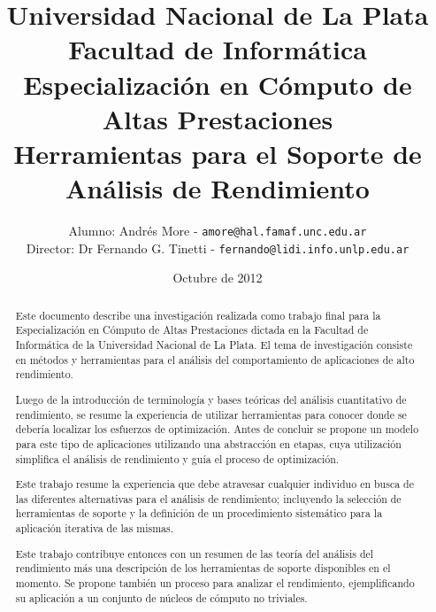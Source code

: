 \documentclass[a4paper]{report}
\begin{document}
\title{Universidad Nacional de La Plata\\Facultad de Inform\'atica\\ \bigskip
  Especializaci\'on en C\'omputo de Altas Prestaciones\\ \bigskip
  Herramientas para el Soporte de An\'alisis de Rendimiento}

\author{
  Alumno: Andr\'es More - {\tt amore@hal.famaf.unc.edu.ar}\\
  Director: Dr Fernando G. Tinetti - {\tt fernando@lidi.info.unlp.edu.ar}
}

\date{Octubre de 2012}

\maketitle

\begin{abstract}

  Este documento describe una investigaci\'on realizada como trabajo final para
  la Especializaci\'on en C\'omputo de Altas Prestaciones dictada en la
  Facultad de Inform\'atica de la Universidad Nacional de La Plata.
  El tema de investigaci\'on consiste en m\'etodos y herramientas para
  el an\'alisis del comportamiento de aplicaciones de alto rendimiento.

  \bigskip

  Luego de la introducci\'on de terminolog\'ia y bases te\'oricas del
  an\'alisis cuantitativo de rendimiento, se resume la experiencia de utilizar
  herramientas para conocer donde se deber\'ia localizar los esfuerzos de
  optimizaci\'on. Antes de concluir se propone un modelo para este tipo de
  aplicaciones utilizando una abstracci\'on en etapas, cuya
  utilizaci\'on simplifica el an\'alisis de rendimiento y gu\'ia el proceso de optimizaci\'on.

  \bigskip

  Este trabajo resume la experiencia que debe atravesar cualquier
  individuo en busca de las diferentes alternativas para el an\'alisis de
  rendimiento; incluyendo la selecci\'on de herramientas de soporte y la
  definici\'on de un procedimiento sistem\'atico para la aplicaci\'on iterativa
  de las mismas.

  \bigskip

  Este trabajo contribuye entonces con un resumen de las teor\'ia del an\'alisis del
  rendimiento m\'as una descripci\'on de los herramientas de soporte 
  disponibles en el momento. Se propone tambi\'en un proceso para analizar el
  rendimiento, ejemplificando su aplicaci\'on a un conjunto de n\'ucleos de
  c\'omputo no triviales.

\end{abstract}
\end{document}

